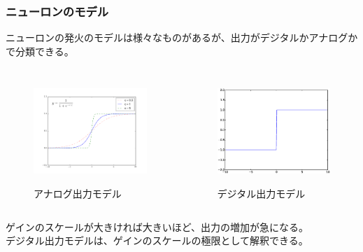 \documentclass[dvipdfmx,11pt,notheorems]{beamer}
\theoremstyle{definition}
\begin{document}
\begin{frame}\frametitle{ニューロンのモデル}
ニューロンの発火のモデルは様々なものがあるが、出力がデジタルかアナログかで分類できる。
\begin{columns}[T]		
\begin{column}[T]{5cm}
\begin{figure}[htbp]
	\includegraphics[height=4cm, width=6cm]{gain.png}
	\caption{アナログ出力モデル}
\end{figure}
\end{column}
\begin{column}[T]{5cm}
\begin{figure}[htbp]
	\includegraphics[height=4cm, width=6cm]{threshold.eps}
	\caption{デジタル出力モデル}
\end{figure}
\end{column}
\end{columns}
ゲインのスケールが大きければ大きいほど、出力の増加が急になる。 \\
デジタル出力モデルは、ゲインのスケールの極限として解釈できる。
\end{frame}
\end{document}
